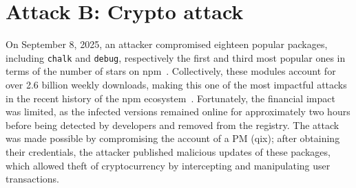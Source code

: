 \section{Attack B: Crypto attack}
\label{sec:attackB}

On September 8, 2025, an attacker compromised eighteen popular packages, including \texttt{chalk} and \texttt{debug}, 
respectively the first and third most popular ones in terms of the number of stars on \ac{npm}~\cite{tristan2026listtop10000}.
Collectively, these modules account for over 2.6 billion weekly downloads,
making this one of the most impactful attacks in the recent history of the \ac{npm} ecosystem~\cite{matthee2025npmsupplychainattack}.
Fortunately, the financial impact was limited, 
as the infected versions remained online for approximately two hours before being detected by developers and removed from the registry.
The attack was made possible by compromising the account of a \ac{PM} (qix);
after obtaining their credentials, the attacker published malicious updates of these packages,
which allowed theft of cryptocurrency by intercepting and manipulating user transactions.


